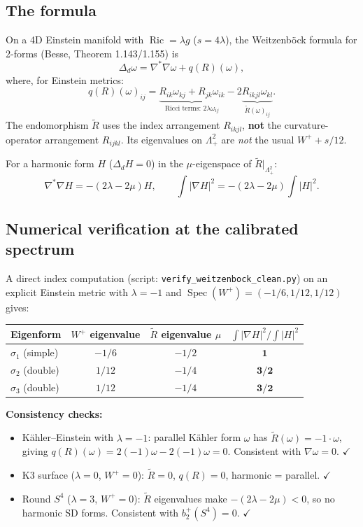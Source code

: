 \subsection{The formula}
On a 4D Einstein manifold with $\operatorname{Ric} = \lambda g$ ($s = 4\lambda$),
the Weitzenb\"ock formula for 2-forms (Besse, Theorem 1.143/1.155) is
\[
\Delta_d\omega = \nabla^*\nabla\omega + q(R)(\omega),
\]
where, for Einstein metrics:
\[
q(R)(\omega)_{ij}
= \underbrace{R_{ik}\omega_{kj} + R_{jk}\omega_{ik}}_{\text{Ricci terms: } 2\lambda\omega_{ij}}
- 2\underbrace{R_{ikjl}\omega_{kl}}_{\widetilde{R}(\omega)_{ij}}.
\]
The endomorphism $\widetilde{R}$ uses the index arrangement
$R_{ikjl}$, \textbf{not} the curvature-operator arrangement $R_{ijkl}$.
Its eigenvalues on $\Lambda^2_+$ are \emph{not} the usual $W^+ + s/12$.

For a harmonic form $H$ ($\Delta_d H = 0$) in the $\mu$-eigenspace
of $\widetilde{R}|_{\Lambda^2_+}$:
\[
\nabla^*\nabla H = -(2\lambda - 2\mu)H,
\qquad
\int|\nabla H|^2 = -(2\lambda - 2\mu)\int|H|^2.
\]

\subsection{Numerical verification at the calibrated spectrum}

A direct index computation (script: \texttt{verify\_weitzenbock\_clean.py})
on an explicit Einstein metric with $\lambda = -1$ and
$\operatorname{Spec}(W^+) = (-1/6, 1/12, 1/12)$ gives:

\begin{center}
\begin{tabular}{lccc}
\hline
Eigenform & $W^+$ eigenvalue & $\widetilde{R}$ eigenvalue $\mu$
& $\int|\nabla H|^2 / \int|H|^2$ \\
\hline
$\sigma_1$ (simple) & $-1/6$ & $-1/2$ & $\mathbf{1}$ \\
$\sigma_2$ (double) & $1/12$ & $-1/4$ & $\mathbf{3/2}$ \\
$\sigma_3$ (double) & $1/12$ & $-1/4$ & $\mathbf{3/2}$ \\
\hline
\end{tabular}
\end{center}

\medskip\noindent
\textbf{Consistency checks:}
\begin{itemize}
\item K\"ahler--Einstein with $\lambda=-1$: parallel K\"ahler form $\omega$
has $\widetilde{R}(\omega) = -1\cdot\omega$, giving
$q(R)(\omega) = 2(-1)\omega - 2(-1)\omega = 0$. Consistent with $\nabla\omega = 0$. $\checkmark$
\item K3 surface ($\lambda = 0$, $W^+ = 0$): $\widetilde{R} = 0$,
$q(R) = 0$, harmonic = parallel. $\checkmark$
\item Round $S^4$ ($\lambda = 3$, $W^+ = 0$): $\widetilde{R}$ eigenvalues
make $-(2\lambda-2\mu) < 0$, so no harmonic SD forms.
Consistent with $b^+_2(S^4) = 0$. $\checkmark$
\end{itemize}

